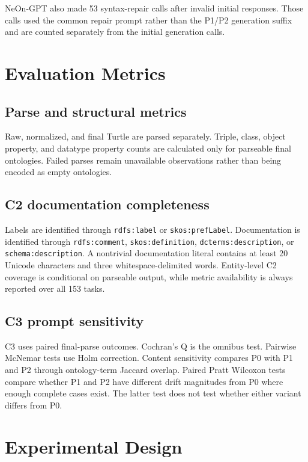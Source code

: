 \documentclass[11pt,a4paper]{article}
\newcommand{\code}[1]{\texttt{#1}}
\begin{document}
NeOn-GPT also made 53 syntax-repair calls after invalid initial responses. Those
calls used the common repair prompt rather than the P1/P2 generation suffix and
are counted separately from the initial generation calls.

\section{Evaluation Metrics}

\subsection{Parse and structural metrics}

Raw, normalized, and final Turtle are parsed separately. Triple, class, object
property, and datatype property counts are calculated only for parseable final
ontologies. Failed parses remain unavailable observations rather than being
encoded as empty ontologies.

\subsection{C2 documentation completeness}

Labels are identified through \code{rdfs:label} or \code{skos:prefLabel}.
Documentation is identified through \code{rdfs:comment},
\code{skos:definition}, \code{dcterms:description}, or
\code{schema:description}. A nontrivial documentation literal contains at least
20 Unicode characters and three whitespace-delimited words. Entity-level C2
coverage is conditional on parseable output, while metric availability is always
reported over all 153 tasks.

\subsection{C3 prompt sensitivity}

C3 uses paired final-parse outcomes. Cochran's Q is the omnibus test. Pairwise
McNemar tests use Holm correction. Content sensitivity compares P0 with P1 and P2 through
ontology-term Jaccard overlap. Paired Pratt Wilcoxon tests compare whether P1 and
P2 have different drift magnitudes from P0 where enough complete cases exist.
The latter test does not test whether either variant differs from P0.

\section{Experimental Design}
\end{document}
